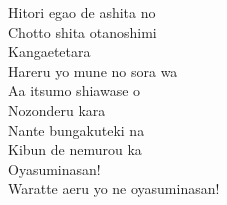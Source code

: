 \begin{multicols}{2}
Hitori egao de ashita no\\
Chotto shita otanoshimi\\
Kangaetetara\\
Hareru yo mune no sora wa\\
Aa itsumo shiawase o\\
Nozonderu kara\\
Nante bungakuteki na\\
Kibun de nemurou ka\\
Oyasuminasan!\\
Waratte aeru yo ne oyasuminasan!
\end{multicols}

\ifdefined\COMPLETE
\else
	
\fi
